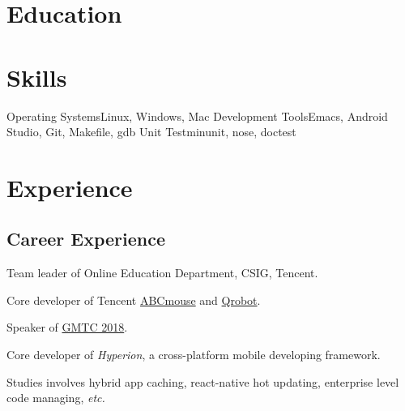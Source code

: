 
\section{\hei Education}



\section{Skills}

           {Operating Systems}{Linux, Windows, Mac}
           {Development Tools}{Emacs, Android Studio, Git, Makefile, gdb}
           {Unit Test}{minunit, nose, doctest}

\section{Experience}

\subsection{Career Experience}

{
  \begin{tightitemize}%
  \item Team leader of Online Education Department, CSIG, Tencent.
  \item Core developer of Tencent \href{https://abcmouse.qq.com}{ABCmouse} and \href{https://qrobot.qq.com/}{Qrobot}.
  \item Speaker of \href{https://www.infoq.cn/article/QXiWs69g24PMk0ldg1to}{GMTC 2018}.
  \end{tightitemize}}

{
\begin{tightitemize}%
 \item Core developer of \textsl{Hyperion}, a cross-platform mobile developing framework.
 \item Studies involves hybrid app caching, react-native hot updating, enterprise level code managing, \textsl{etc.}
 \end{tightitemize}}


